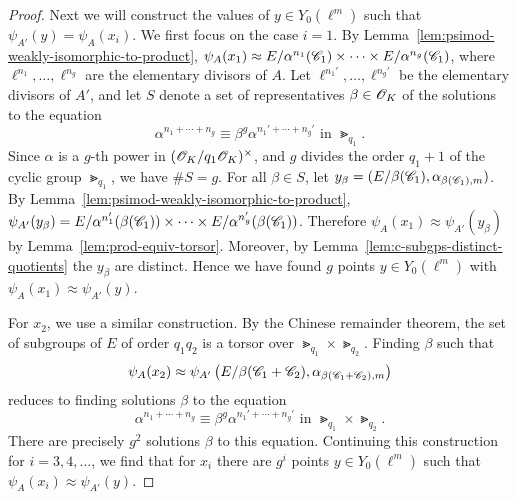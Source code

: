 \documentclass{amsart}
\begin{document}
\begin{proof}
    Next we will construct the values of $y \in Y_0(\ell^m)$ such that $\psi_{A'}(y) = \psi_{A}(x_i)$. We first focus on the case $i = 1$. By Lemma~\ref{lem:psimod-weakly-isomorphic-to-product}, $\psi_{A}(x_1) \approx E/\alpha^{n_1}(\mathscr{C}_1) \times \cdots \times E/\alpha^{n_g}(\mathscr{C}_1)$, where $\ell^{n_1},\dots,\ell^{n_g}$ are the elementary divisors of $A$.
    Let $\ell^{n_1'},\dots,\ell^{n_g'}$ be the elementary divisors of $A'$, and let $S$ denote a set of representatives $\beta \in \mathscr{O}_K$ of the solutions to the equation
    \[
      \alpha^{n_1 + \cdots + n_g} \equiv \beta^g\alpha^{n_1' + \cdots + n_g'}
      \text{ in } \Gt_{q_1}.
    \]
Since $\alpha$ is a $g$-th power in  $(\mathscr{O}_K/q_1\mathscr{O}_K)^\times$, and  $g$ divides the order $q_1 + 1$ of the cyclic group $\Gt_{q_1}$,
   we have $\#S = g$. For all $\beta \in S$, let $y_\beta = (E/\beta(\mathscr{C}_1),\alpha_{\beta(\mathscr{C}_1),m})$. By Lemma~\ref{lem:psimod-weakly-isomorphic-to-product}, $\psi_{A'}(y_\beta) = E/\alpha^{n_1'}(\beta(\mathscr{C}_1)) \times \cdots \times E/\alpha^{n_g'}(\beta(\mathscr{C}_1))$. Therefore $\psi_A(x_1) \approx \psi_{A'}(y_\beta)$ by Lemma~\ref{lem:prod-equiv-torsor}. Moreover, by Lemma~\ref{lem:c-subgps-distinct-quotients} the $y_\beta$ are distinct. Hence we have found $g$ points $y \in Y_0(\ell^m)$ with $\psi_{A}(x_1) \approx \psi_{A'}(y)$.

  For $x_2$, we use a similar construction. By the Chinese remainder theorem, the set of subgroups of $E$ of order $q_1q_2$ is a torsor over $\Gt_{q_1} \times \Gt_{q_2}$. Finding $\beta$ such that
  \[
    \psi_{A}(x_2) \approx \psi_{A'}\left(E/\beta(\mathscr{C}_1+\mathscr{C}_2),\alpha_{\beta(\mathscr{C}_1+\mathscr{C}_2),m}\right)
  \]
  reduces to finding solutions $\beta$ to the equation
  \[
    \alpha^{n_1 + \cdots + n_g} \equiv \beta^g\alpha^{n_1' + \cdots + n_g'}
    \text{ in } \Gt_{q_1} \times \Gt_{q_2}.
  \]
There are precisely $g^2$ solutions $\beta$ to this equation. Continuing this construction for $i=3,4,\dots$, we find that for $x_i$ there are $g^i$ points $y \in Y_0(\ell^m)$ such that $\psi_{A}(x_i) \approx \psi_{A'}(y)$.
\end{proof}
\end{document}
